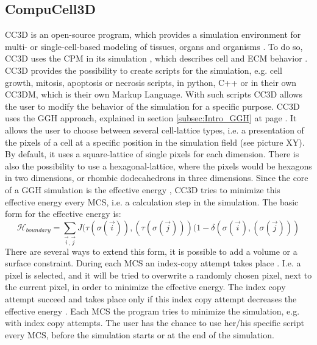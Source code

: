 \subsection{CompuCell3D}
\ac{CC3D} is an open-source program, which provides a simulation environment for multi- or single-cell-based modeling of tissues, organs and organisms \cite{CC3D.org}. To do so, \ac{CC3D} uses the \ac{CPM} in its simulation \cite{CC3D.org}, which describes cell and \ac{ECM} behavior \cite{Izaguirre2004}. 
CC3D provides the possibility to create scripts for the simulation, e.g. cell growth, mitosis, apoptosis or necrosis scripts, in python, C++ or in their own CC3DM, which is their own Markup Language. With such scripts CC3D allows the user to modify the behavior of the simulation for a specific purpose.
CC3D uses the \ac{GGH} approach, explained in section \ref{subsec:Intro_GGH} at page \pageref{subsec:Intro_GGH}. It allows the user to choose between several cell-lattice types, i.e. a presentation of the pixels of a cell at a specific position in the simulation field (see picture XY). By default, it uses a square-lattice of single pixels for each dimension. There is also the possibility to use a hexagonal-lattice, where the pixels would be hexagons in two dimensions, or rhombic dodecahedrons in three dimensions.
Since the core of a \ac{GGH} simulation is the effective energy \cite{IntroCC3D}, \ac{CC3D} tries to minimize this effective energy every \ac{MCS}, i.e. a calculation step in the simulation. The basic form for the effective energy is:
\begin{equation}
\mathcal{H}_{boundary} = \sum_{\vec{i},\vec{j}}^{ }{J(\tau(\sigma(\vec{i})),(\tau(\sigma(\vec{j})))(1-\delta(\sigma(\vec{i}),(\sigma(\vec{j})))}
\end{equation}
There are several ways to extend this form, it is possible to add a volume or a surface constraint. During each \ac{MCS} an index-copy attempt takes place \cite{MaciejH.Swat2017}. I.e. a pixel is selected, and it will be tried to overwrite a randomly chosen pixel, next to the current pixel, in order to minimize the effective energy. The index copy attempt succeed and takes place only if this index copy attempt decreases the effective energy \cite{IntroCC3D}. Each \ac{MCS} the program tries to minimize the simulation, e.g. with index copy attempts. The user has the chance to use her/his specific script every \ac{MCS}, before the simulation starts or at the end of the simulation.



